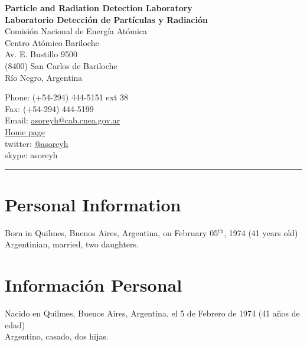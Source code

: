 \begin{minipage}[t]{0.570\textwidth}
\ifeng
{\bf{Particle and Radiation Detection Laboratory}}\\
\else
{\bf{Laboratorio Detección de Partículas y Radiación}}\\
\fi
  Comisión Nacional de Energía Atómica\\
  Centro Atómico Bariloche\\
  Av. E. Bustillo 9500\\
  (8400) San Carlos de Bariloche\\
  Río Negro, Argentina\\[.2cm]
\end{minipage}
\begin{minipage}[t]{0.465\textwidth}
  Phone: (+54-294) 444-5151 ext 38\\
  Fax: (+54-294) 444-5199\\
  Email: \href{mailto:asoreyh@cab.cnea.gov.ar}{asoreyh@cab.cnea.gov.ar}\\
  \href{http://fisica.cab.cnea.gov.ar/particulas/wiki/User:Asoreyh}{Home page}\\
  twitter: \href{https://twitter.com/#!/asoreyh}{@asoreyh}\\
  skype: asoreyh\\
\end{minipage}


\hrule

\ifeng
\section*{Personal Information}
Born in Quilmes, Buenos Aires, Argentina, on February 05$^\mathrm{th}$, 1974 (41 years old)\\
Argentinian, married, two daughters.
\else
\section*{Información Personal}
Nacido en Quilmes, Buenos Aires, Argentina, el 5 de Febrero de 1974 (41 años de edad)\\
Argentino, casado, dos hijas.
\fi
